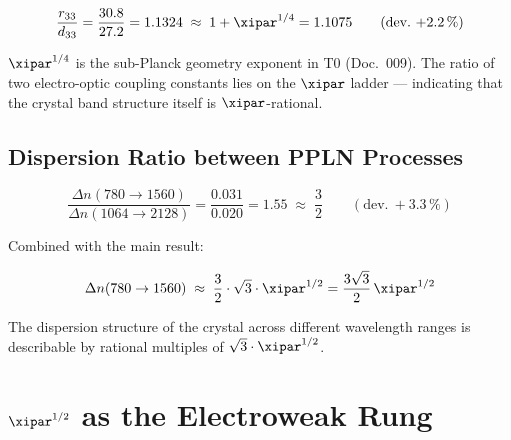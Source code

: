 \begin{equation}
    \frac{r_{33}}{d_{33}} = \frac{30.8}{27.2} = 1.1324
    \;\approx\; 1 + \xipar^{1/4} = 1.1075
    \qquad (\text{dev.}\ {+}2.2\,\%)
\end{equation}

$\xipar^{1/4}$ is the sub-Planck geometry exponent in T0 (Doc.~009).
The ratio of two electro-optic coupling constants lies on the $\xipar$
ladder — indicating that the crystal band structure itself is
$\xipar$-rational.

\subsection{Dispersion Ratio between PPLN Processes}

\begin{equation}
    \frac{\Delta n(780 \to 1560)}{\Delta n(1064 \to 2128)}
    = \frac{0.031}{0.020} = 1.55
    \;\approx\; \frac{3}{2}
    \qquad (\text{dev.}\ {+}3.3\,\%)
\end{equation}

Combined with the main result:

\begin{equation}
    \Delta n(780 \to 1560)
    \;\approx\; \frac{3}{2}\cdot\sqrt{3}\cdot\xipar^{1/2}
    = \frac{3\sqrt{3}}{2}\,\xipar^{1/2}
\end{equation}

The dispersion structure of the crystal across different wavelength ranges
is describable by rational multiples of $\sqrt{3}\cdot\xipar^{1/2}$.

\clearpage

\section{\texorpdfstring{$\xipar^{1/2}$}{xi\^{}(1/2)} as the Electroweak Rung}
\label{sec:classification}

